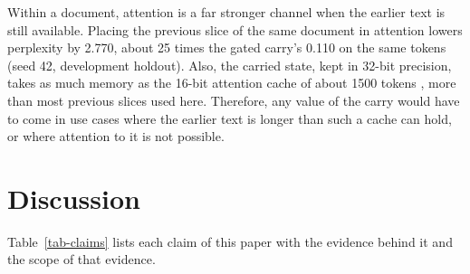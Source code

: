 \documentclass[10pt]{article} %
\begin{document}
Within a document, attention is a far stronger channel when the earlier text is still available. Placing the previous slice of the same document in attention lowers perplexity by 2.770, about 25 times the gated carry's 0.110 on the same tokens (seed 42, development holdout). Also, the carried state, kept in 32-bit precision, takes as much memory as the 16-bit attention cache of about 1500 tokens \citep{ainslie2023gqa,yang2025qwen3}, more than most previous slices used here. Therefore, any value of the carry would have to come in use cases where the earlier text is longer than such a cache can hold, or where attention to it is not possible.

\section{Discussion}

Table~\ref{tab-claims} lists each claim of this paper with the evidence behind it and the scope of that evidence.
\end{document}
